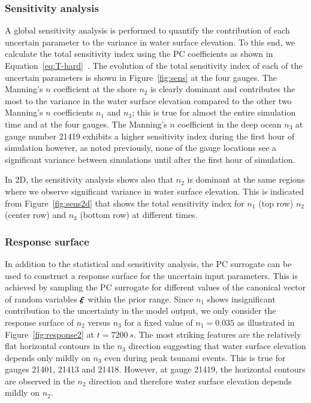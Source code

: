         
\subsubsection{Sensitivity analysis}
A global sensitivity analysis is performed to quantify the contribution of each
uncertain parameter to the variance in water surface elevation. To this end, we calculate 
the total sensitivity index using the PC coefficients as shown in Equation~\eqref{eq:T-hard}~\citep{Alexanderian2012,Sudret,Crestaux}. The evolution of the total sensitivity index
of each of the uncertain parameters is shown in Figure~\ref{fig:sens} at the four gauges. 
The Manning's $n$ coefficient at the shore $n_2$ is clearly dominant and contributes
the most to the variance in the water surface elevation compared to the other two 
Manning's $n$ coefficients $n_1$ and $n_3$; this is true for almost the entire simulation time
and at the four gauges. The Manning's $n$ coefficient in the deep ocean $n_{3}$ at gauge number 21419 exhibits a higher sensitivity index during the first hour of simulation however, as noted previously, none of the gauge locations see a significant variance between simulations until after the first hour of simulation.

In 2D, the sensitivity analysis shows also that $n_2$ is dominant
at the same regions where we observe significant variance in water surface elevation. This is
indicated from Figure~\ref{fig:sens2d} that shows the total sensitivity index
for $n_1$ (top row) $n_2$ (center row) and $n_3$ (bottom row)
at different times.

\subsubsection{Response surface}
In addition to the statistical and sensitivity analysis, the PC surrogate 
can be used to construct a response surface for the uncertain input parameters.
This is achieved by sampling the PC surrogate for different values of the 
canonical vector of random variables  $\xxi$ within the prior
range. Since $n_1$ shows insignificant contribution to the 
uncertainty in the model output, we only consider the response surface
of $n_2$ versus $n_3$ for a fixed value of $n_1=0.035$ as illustrated in Figure~\ref{fig:response2}
at $t=7200~s$. The most striking features are the relatively flat
horizontal contours in the $n_3$ direction suggesting that water surface elevation depends
only mildly on $n_3$ even during peak tsunami events. This is true for gauges 21401, 21413 and 21418. However,
at gauge 21419, the horizontal contours are observed in the $n_2 $ direction
and therefore water surface elevation depends mildly on $n_2$.